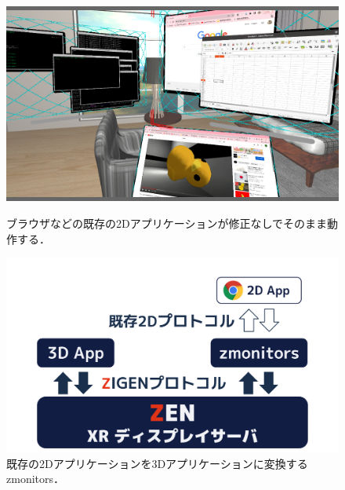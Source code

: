 \begin{figure}[htbp]
  \begin{minipage}[t]{0.50\linewidth}
    \centering
    \includegraphics[keepaspectratio, width=\linewidth]{fig/2d-apps.png}
    \caption{
      ブラウザなどの既存の2Dアプリケーションが修正なしでそのまま動作する．
    }
    \label{fig:2d-apps}
  \end{minipage}
  \begin{minipage}[t]{0.50\linewidth}
    \centering
    \includegraphics[keepaspectratio, width=\linewidth]{fig/zmonitors.png}
    \caption{
      既存の2Dアプリケーションを3Dアプリケーションに変換するzmonitors．
    }
    \label{fig:zmonitors}
  \end{minipage}
\end{figure}

